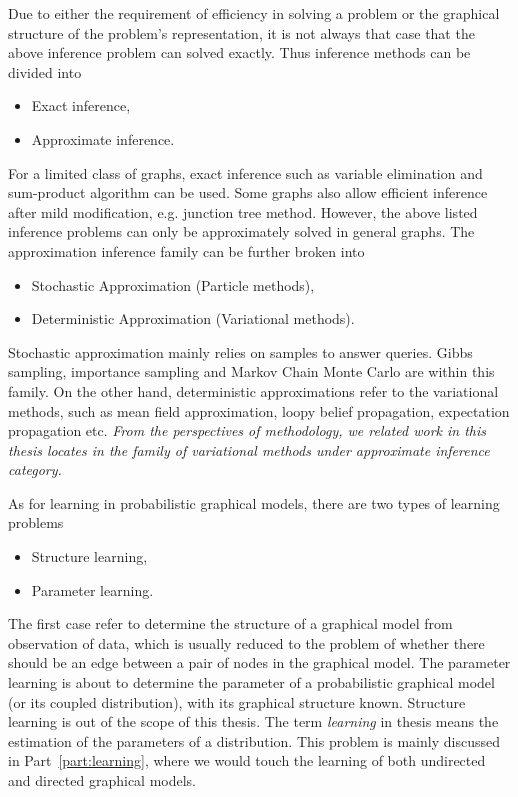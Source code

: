 Due to either the requirement of efficiency in solving a problem or the graphical structure of the problem's representation, it is not always that case that the above inference problem can solved exactly. Thus inference methods can be divided into
\begin{itemize}
\item Exact inference,
\item Approximate inference.
\end{itemize}
For a limited class of graphs, exact inference such as variable elimination and sum-product algorithm can be used. Some graphs also allow efficient inference after mild modification, e.g. junction tree method. However, the above listed inference problems can only be approximately solved in general graphs. The approximation inference family can be further broken into
\begin{itemize}
\item Stochastic Approximation (Particle methods),
\item Deterministic Approximation (Variational methods).
\end{itemize}
Stochastic approximation mainly relies on samples to answer queries. Gibbs sampling, importance sampling and Markov Chain Monte Carlo are within this family. On the other hand, deterministic approximations refer to the variational methods, such as mean field approximation, loopy belief propagation, expectation propagation etc. \textit{From the perspectives of methodology, we related work in this thesis locates in the family of variational methods under approximate inference category.}


As for learning in probabilistic graphical models, there are two types of learning problems
\begin{itemize}
\item Structure learning,
\item Parameter learning.
\end{itemize}
The first case refer to determine the structure of a graphical model from observation of data, which is usually reduced to the problem of whether there should be an edge between a pair of nodes in the graphical model. The parameter learning is about to determine the parameter of a probabilistic graphical model (or its coupled distribution), with its graphical structure known. Structure learning is out of the scope of this thesis. The term \textit{learning} in thesis means the estimation of the parameters of a distribution. This problem is mainly discussed in Part~\ref{part:learning}, where we would touch the learning of both undirected and directed graphical models.


